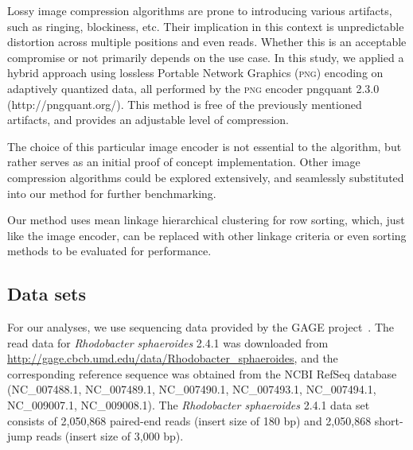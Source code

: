 \documentclass{bioinfo}
\begin{document}
\begin{methods}
Lossy image compression algorithms are prone to introducing various artifacts, such as ringing, blockiness, etc. Their implication in this context is unpredictable distortion across multiple positions and even reads. Whether this is an acceptable compromise or not primarily depends on the use case.  In this study, we applied a hybrid approach using lossless Portable Network Graphics (\textsc{png}) encoding on adaptively quantized data, all performed by the \textsc{png} encoder pngquant 2.3.0 (http://pngquant.org/). This method is free of the previously mentioned artifacts, and provides an adjustable level of compression.

The choice of this particular image encoder is not essential to the algorithm, but rather serves as an initial proof of concept implementation. Other image compression algorithms could be explored extensively, and seamlessly substituted into our method for further benchmarking.

Our method uses mean linkage hierarchical clustering for row sorting, which, just like the image encoder, can be replaced with other linkage criteria or even sorting methods to be evaluated for performance.

\subsection{Data sets}

For our analyses, we use sequencing data provided by the \textsc{GAGE} project~\cite{salzberg2012gage}.
The read data for \textit{Rhodobacter sphaeroides} 2.4.1 was downloaded from
\href{http://gage.cbcb.umd.edu/data/Rhodobacter_sphaeroides}{http://gage.cbcb.umd.edu/data/Rhodobacter\_sphaeroides},
and the corresponding reference sequence was obtained from the NCBI RefSeq database (NC\_007488.1, NC\_007489.1, NC\_007490.1, NC\_007493.1, NC\_007494.1, NC\_009007.1, NC\_009008.1).
The \textit{Rhodobacter sphaeroides} 2.4.1 data set consists of 2,050,868 paired-end reads (insert size of 180 bp) and 2,050,868 short-jump reads (insert size of 3,000 bp).




\end{methods}
\end{document}
